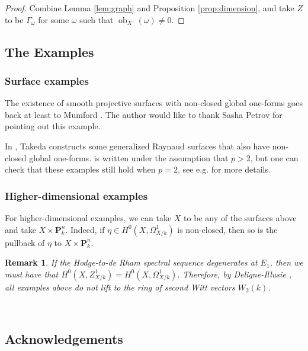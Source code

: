 \documentclass[11pt]{amsart}
\newtheorem{remark}[theorem]{Remark}
\begin{document}
\begin{proof}
    Combine Lemma \ref{lem:graph} and Proposition \ref{prop:dimension}, and take $Z$ to be $\Gamma_{\omega}$ for some $\omega$ such that $\operatorname{ob}_{X'}(\omega)\neq 0$.
\end{proof}




\subsection{The Examples}\;


\subsubsection{Surface examples}\;

The existence of smooth projective surfaces with non-closed global
one-forms goes back at least to Mumford \cite[Corollary on p.341]{MumfordPathologies}.
The author would like to thank Sasha Petrov for pointing out this example.

In \cite[Corollary 3.4 and the paragraph following it]{Takeda}, Takeda constructs some generalized Raynaud surfaces that also have non-closed global one-forms.
\cite{Takeda} is written under the assumption that $p>2$, but one can check that these examples still hold when $p=2$, see e.g. \cite[\S5]{Tziolas} for more details.





\subsubsection{Higher-dimensional examples}\;

For higher-dimensional examples, we can take $X$ to be any of the surfaces above and take 
$X\times\mathbf P^n_k$.
Indeed, if $\eta\in H^0(X,\Omega_{X/k}^1)$ is non-closed, then so is the pullback of $\eta$ to $X\times\mathbf P^n_k$.

\begin{remark}
    If the Hodge-to-de Rham spectral sequence degenerates at $E_1$, then we must have that $H^0(X,Z^1_{X/k})= H^0(X,\Omega^1_{X/k})$.
    Therefore, by Deligne-Illusie \cite[Theorem 2.1 and Corollary 2.5]{DI}, all examples above do not lift to the ring of second Witt vectors $W_2(k)$.
\end{remark}

\;\\


\subsection*{Acknowledgements}\;
\end{document}

